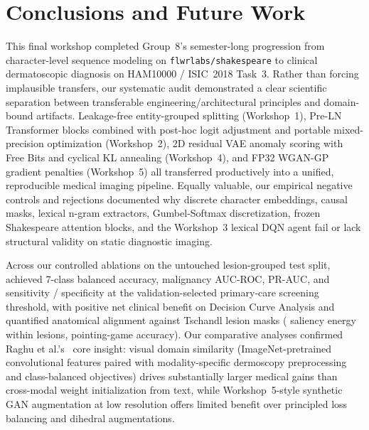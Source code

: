 \section{Conclusions and Future Work}
\label{sec:conclusions}

This final workshop completed Group~8's semester-long progression from character-level sequence modeling on \texttt{flwrlabs/shakespeare} to clinical dermatoscopic diagnosis on HAM10000 / ISIC~2018 Task~3. Rather than forcing implausible transfers, our systematic audit demonstrated a clear scientific separation between transferable engineering/architectural principles and domain-bound artifacts. Leakage-free entity-grouped splitting (Workshop~1), Pre-LN Transformer blocks combined with post-hoc logit adjustment and portable mixed-precision optimization (Workshop~2), 2D residual VAE anomaly scoring with Free Bits and cyclical KL annealing (Workshop~4), and FP32 WGAN-GP gradient penalties (Workshop~5) all transferred productively into a unified, reproducible medical imaging pipeline. Equally valuable, our empirical negative controls and rejections documented why discrete character embeddings, causal masks, lexical n-gram extractors, Gumbel-Softmax discretization, frozen Shakespeare attention blocks, and the Workshop~3 lexical DQN agent fail or lack structural validity on static diagnostic imaging.

Across our controlled ablations on the untouched lesion-grouped test split, \WSixBestModel{} achieved \WSixBestBalAcc{} 7-class balanced accuracy, \WSixBestMalAUC{} malignancy AUC-ROC, \WSixBestMalPRAUC{} PR-AUC, and \WSixBestSensScr{} sensitivity / \WSixBestSpecScr{} specificity at the validation-selected primary-care screening threshold, with positive net clinical benefit on Decision Curve Analysis and quantified anatomical alignment against Tschandl lesion masks (\WSixXaiLesionEnergy{} saliency energy within lesions, \WSixXaiPointingAcc{} pointing-game accuracy). Our comparative analyses confirmed Raghu et al.'s~\cite{Raghu2019transfusion} core insight: visual domain similarity (ImageNet-pretrained convolutional features paired with modality-specific dermoscopy preprocessing and class-balanced objectives) drives substantially larger medical gains than cross-modal weight initialization from text, while Workshop~5-style synthetic GAN augmentation at low resolution offers limited benefit over principled loss balancing and dihedral augmentations.

